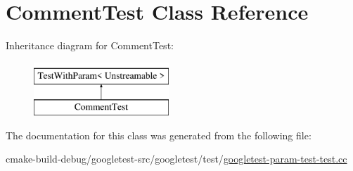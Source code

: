 \hypertarget{classCommentTest}{}\section{Comment\+Test Class Reference}
\label{classCommentTest}
Inheritance diagram for Comment\+Test\+:\begin{figure}[H]
\begin{center}
\leavevmode
\includegraphics[height=2.000000cm]{classCommentTest}
\end{center}
\end{figure}


The documentation for this class was generated from the following file\+:\begin{DoxyCompactItemize}
\item 
cmake-\/build-\/debug/googletest-\/src/googletest/test/\mbox{\hyperlink{googletest-param-test-test_8cc}{googletest-\/param-\/test-\/test.\+cc}}\end{DoxyCompactItemize}
